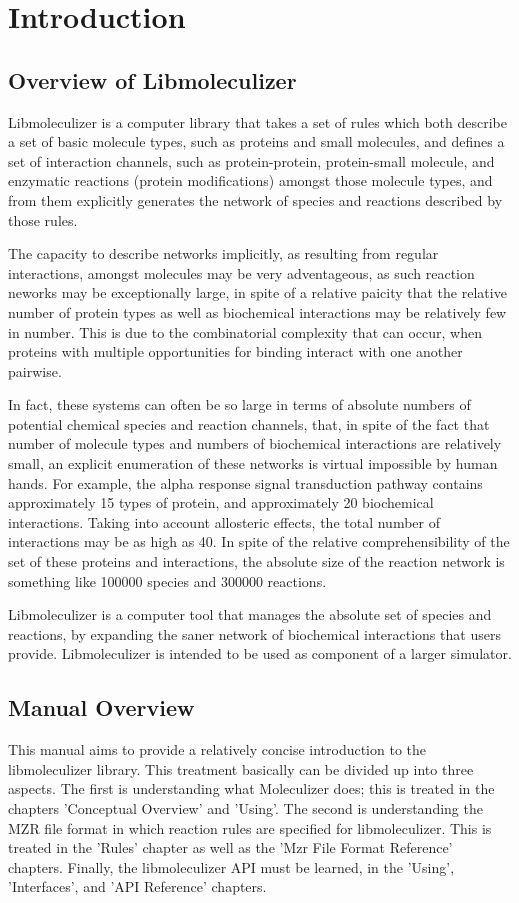 \chapter{Introduction}

\section{Overview of Libmoleculizer}
Libmoleculizer is a computer library that takes a set of rules which
both describe a set of basic molecule types, such as proteins and
small molecules, and defines a set of interaction channels, such as
protein-protein, protein-small molecule, and enzymatic reactions
(protein modifications) amongst those molecule types, and from them
explicitly generates the network of species and reactions described by
those rules.

The capacity to describe networks implicitly, as resulting from
regular interactions, amongst molecules may be very adventageous, as
such reaction neworks may be exceptionally large, in spite of a
relative paicity that the relative number of protein types as well as biochemical interactions may be relatively
few in number.  This is due to the combinatorial complexity that can
occur, when proteins with multiple opportunities for binding interact
with one another pairwise.  

In fact, these systems can often be so large in terms of absolute
numbers of potential chemical species and reaction channels, that, in
spite of the fact that number of molecule types and numbers of
biochemical interactions are relatively small, an explicit enumeration
of these networks is virtual impossible by human hands.  For example,
the alpha response signal transduction pathway contains approximately
15 types of protein, and approximately 20 biochemical interactions.
Taking into account allosteric effects, the total number of
interactions may be as high as 40.  In spite of the relative
comprehensibility of the set of these proteins and interactions, the
absolute size of the reaction network is something like 100000 species
and 300000 reactions.  

Libmoleculizer is a computer tool that manages the absolute set of
species and reactions, by expanding the saner network of biochemical
interactions that users provide.  Libmoleculizer is intended to be
used as component of a larger simulator.

\section{Manual Overview}
This manual aims to provide a relatively concise introduction to the
libmoleculizer library.  This treatment basically can be divided up
into three aspects.  The first is understanding what Moleculizer does;
this is treated in the chapters 'Conceptual Overview' and 'Using'.
The second is understanding the MZR file format in which reaction
rules are specified for libmoleculizer.  This is treated in the
'Rules' chapter as well as the 'Mzr File Format Reference' chapters.
Finally, the libmoleculizer API must be learned, in the 'Using',
'Interfaces', and 'API Reference' chapters.  

